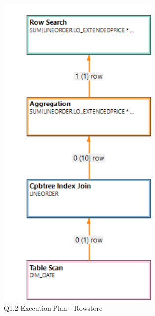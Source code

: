 \begin{figure}[H]
	\centering
	\includegraphics[width=0.7\textwidth]{images/q1-2-row-exec.png}
	\caption{Q1.2 Execution Plan - Rowstore}\label{exec:q1.2-row}
\end{figure}


